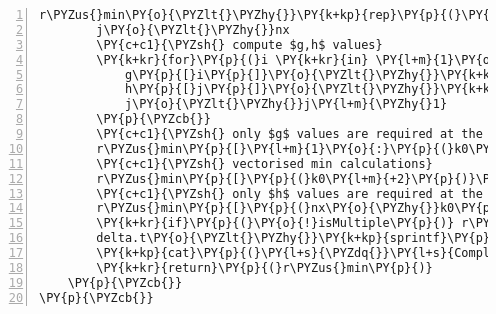 \begin{Verbatim}[commandchars=\\\{\},codes={\catcode`\$=3\catcode`\^=7\catcode`\_=8},gobble=0,numbers=left,fontfamily=fvm,fontshape=n,fontsize=\footnotesize,tabsize=2]
		r\PYZus{}min\PY{o}{\PYZlt{}\PYZhy{}}\PY{k+kp}{rep}\PY{p}{(}\PY{l+m}{0}\PY{p}{,}nx\PY{p}{)}
		j\PY{o}{\PYZlt{}\PYZhy{}}nx
		\PY{c+c1}{\PYZsh{} compute $g,h$ values}
		\PY{k+kr}{for}\PY{p}{(}i \PY{k+kr}{in} \PY{l+m}{1}\PY{o}{:}nx\PY{p}{)}\PY{p}{\PYZob{}}
			g\PY{p}{[}i\PY{p}{]}\PY{o}{\PYZlt{}\PYZhy{}}\PY{k+kp}{ifelse}\PY{p}{(}i\PY{o}{\PYZpc{}\PYZpc{}}k\PY{o}{==}\PY{l+m}{1}\PY{p}{,}f\PY{p}{[}i\PY{p}{]}\PY{p}{,}\PY{k+kp}{min}\PY{p}{(}g\PY{p}{[}i\PY{l+m}{\PYZhy{}1}\PY{p}{]}\PY{p}{,}f\PY{p}{[}i\PY{p}{]}\PY{p}{)}\PY{p}{)}
			h\PY{p}{[}j\PY{p}{]}\PY{o}{\PYZlt{}\PYZhy{}}\PY{k+kp}{ifelse}\PY{p}{(}j\PY{o}{\PYZpc{}\PYZpc{}}k\PY{o}{==}\PY{l+m}{0}\PY{p}{,}f\PY{p}{[}j\PY{p}{]}\PY{p}{,}\PY{k+kp}{min}\PY{p}{(}h\PY{p}{[}j\PY{l+m}{+1}\PY{p}{]}\PY{p}{,}f\PY{p}{[}j\PY{p}{]}\PY{p}{)}\PY{p}{)}
			j\PY{o}{\PYZlt{}\PYZhy{}}j\PY{l+m}{\PYZhy{}1}
		\PY{p}{\PYZcb{}}
		\PY{c+c1}{\PYZsh{} only $g$ values are required at the left}
		r\PYZus{}min\PY{p}{[}\PY{l+m}{1}\PY{o}{:}\PY{p}{(}k0\PY{l+m}{+1}\PY{p}{)}\PY{p}{]}\PY{o}{\PYZlt{}\PYZhy{}}g\PY{p}{[}\PY{p}{(}k0\PY{l+m}{+1}\PY{p}{)}\PY{o}{:}k\PY{p}{]}
		\PY{c+c1}{\PYZsh{} vectorised min calculations}
		r\PYZus{}min\PY{p}{[}\PY{p}{(}k0\PY{l+m}{+2}\PY{p}{)}\PY{o}{:}\PY{p}{(}nx\PY{o}{\PYZhy{}}k0\PY{l+m}{\PYZhy{}1}\PY{p}{)}\PY{p}{]}\PY{o}{\PYZlt{}\PYZhy{}}\PY{k+kp}{pmin}\PY{p}{(}g\PY{p}{[}\PY{p}{(}k\PY{l+m}{+1}\PY{p}{)}\PY{o}{:}\PY{p}{(}nx\PY{l+m}{\PYZhy{}1}\PY{p}{)}\PY{p}{]}\PY{p}{,}h\PY{p}{[}\PY{l+m}{2}\PY{o}{:}\PY{p}{(}nx\PY{o}{\PYZhy{}}k\PY{p}{)}\PY{p}{]}\PY{p}{)}
		\PY{c+c1}{\PYZsh{} only $h$ values are required at the left}
		r\PYZus{}min\PY{p}{[}\PY{p}{(}nx\PY{o}{\PYZhy{}}k0\PY{p}{)}\PY{o}{:}nx\PY{p}{]}\PY{o}{\PYZlt{}\PYZhy{}}h\PY{p}{[}\PY{p}{(}nx\PY{o}{\PYZhy{}}k\PY{l+m}{+1}\PY{p}{)}\PY{o}{:}\PY{p}{(}nx\PY{o}{\PYZhy{}}k0\PY{p}{)}\PY{p}{]}
		\PY{k+kr}{if}\PY{p}{(}\PY{o}{!}isMultiple\PY{p}{)} r\PYZus{}min\PY{o}{\PYZlt{}\PYZhy{}}r\PYZus{}min\PY{p}{[}\PY{o}{\PYZhy{}}rem.indxs\PY{p}{]}
		delta.t\PY{o}{\PYZlt{}\PYZhy{}}\PY{k+kp}{sprintf}\PY{p}{(}\PY{l+s}{\PYZdq{}}\PY{l+s}{\PYZpc{}.2f\PYZdq{}}\PY{p}{,}\PY{k+kp}{proc.time}\PY{p}{(}\PY{p}{)}\PY{p}{[}\PY{l+m}{3}\PY{p}{]}\PY{o}{\PYZhy{}}t1\PY{p}{)} \PY{c+c1}{\PYZsh{}\PYZsh{}\PYZsh{} time elapsed}
		\PY{k+kp}{cat}\PY{p}{(}\PY{l+s}{\PYZdq{}}\PY{l+s}{Completed morphological erosion in\PYZdq{}}\PY{p}{,}delta.t\PY{p}{,}\PY{l+s}{\PYZdq{}}\PY{l+s}{seconds\PYZbs{}n\PYZdq{}}\PY{p}{)}
		\PY{k+kr}{return}\PY{p}{(}r\PYZus{}min\PY{p}{)}
	\PY{p}{\PYZcb{}}
\PY{p}{\PYZcb{}}
\end{Verbatim}
